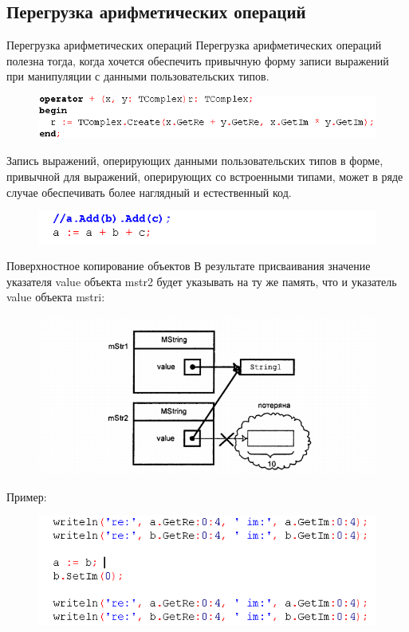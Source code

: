 \documentclass{beamer}
\begin{document}
\subsection{Перегрузка арифметических операций}
\begin{frame}{Перегрузка арифметических операций}
Перегрузка арифметических операций полезна тогда, когда хочется обеспечить привычную форму записи выражений при манипуляции с данными
пользовательских типов. 
\begin{figure}[h]
\centering
\includegraphics[scale=0.5]{images/lec06-pic07.png}
\end{figure}
Запись выражений, оперирующих данными пользовательских типов в форме, привычной для выражений, оперирующих со встроенными типами, может в ряде случае обеспечивать более наглядный и естественный код.
\begin{figure}[h]
\centering
\includegraphics[scale=0.6]{images/lec06-pic08.png}
\end{figure}
\end{frame}

\begin{frame}{Поверхностное копирование объектов}
В результате присваивания значение указателя value объекта mstr2
будет указывать на ту же память, что и указатель value объекта mstri:
\begin{figure}[h]
\centering
\includegraphics[scale=0.4]{images/lec06-pic09.png}
\end{figure}
Пример:
\begin{figure}[h]
\centering
\includegraphics[scale=0.5]{images/lec06-pic10.png}
\end{figure}
\end{frame}
  
\end{document}
